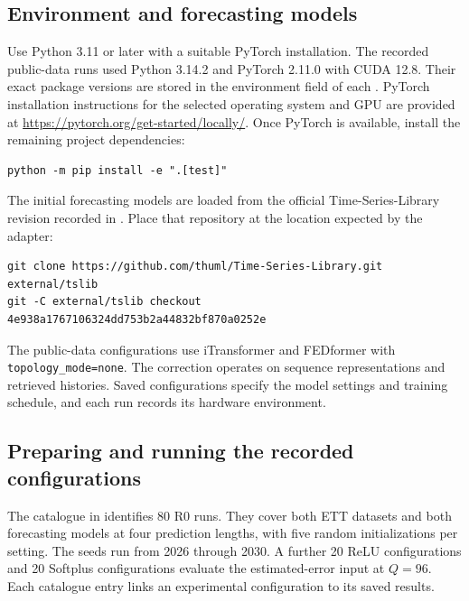 \subsection*{Environment and forecasting models}
Use Python 3.11 or later with a suitable PyTorch installation. The recorded public-data runs used Python 3.14.2 and PyTorch 2.11.0 with CUDA 12.8. Their exact package versions are stored in the environment field of each . PyTorch installation instructions for the selected operating system and GPU are provided at \url{https://pytorch.org/get-started/locally/}. Once PyTorch is available, install the remaining project dependencies:
\begin{lstlisting}
python -m pip install -e ".[test]"
\end{lstlisting}
The initial forecasting models are loaded from the official Time-Series-Library revision recorded in . Place that repository at the location expected by the adapter:
\begin{lstlisting}
git clone https://github.com/thuml/Time-Series-Library.git external/tslib
git -C external/tslib checkout 4e938a1767106324dd753b2a44832bf870a0252e
\end{lstlisting}
The public-data configurations use iTransformer and FEDformer with \texttt{topology\_mode=none}. The correction operates on sequence representations and retrieved histories. Saved configurations specify the model settings and training schedule, and each run records its hardware environment.

\subsection*{Preparing and running the recorded configurations}
The catalogue in  identifies 80 R0 runs. They cover both ETT datasets and both forecasting models at four prediction lengths, with five random initializations per setting. The seeds run from 2026 through 2030. A further 20 ReLU configurations and 20 Softplus configurations evaluate the estimated-error input at $Q=96$. Each catalogue entry links an experimental configuration to its saved results.

